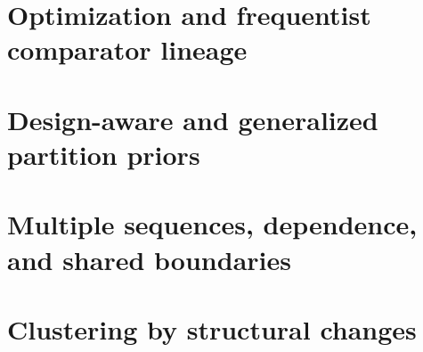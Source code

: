 \section{Optimization and frequentist comparator lineage}









\section{Design-aware and generalized partition priors}



\section{Multiple sequences, dependence, and shared boundaries}





\section{Clustering by structural changes}

